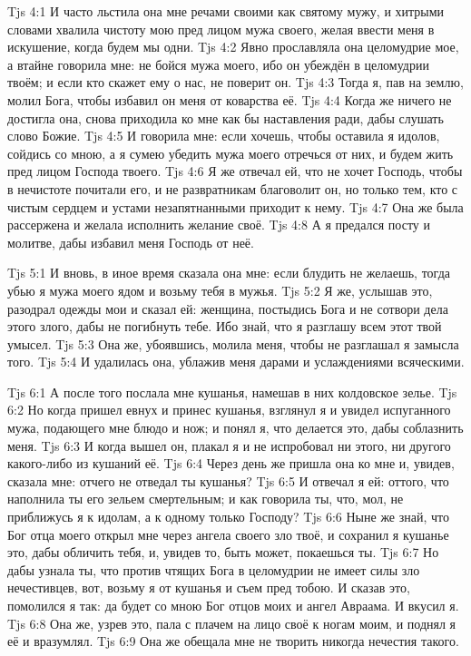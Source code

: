 \vs Tjs 4:1
И часто льстила она мне речами своими как святому мужу,
и хитрыми словами хвалила чистоту мою пред лицом мужа своего,
желая ввести меня в искушение,
когда будем мы одни.
\vs Tjs 4:2
Явно прославляла она целомудрие мое,
а втайне говорила мне: не бойся мужа моего, ибо он убеждён
в целомудрии твоём;
и если кто скажет ему о нас, не поверит он.
\vs Tjs 4:3
Тогда я, пав на землю, молил Бога,
чтобы избавил он меня от коварства её.
\vs Tjs 4:4
Когда же ничего не достигла она,
снова приходила ко мне как бы наставления ради,
дабы слушать слово Божие.
\vs Tjs 4:5
И говорила мне:
если хочешь, чтобы оставила я идолов,
сойдись со мною, а я сумею убедить мужа моего отречься от них,
и будем жить пред лицом Господа твоего.
\vs Tjs 4:6
Я же отвечал ей, что не хочет Господь,
чтобы в нечистоте почитали его,
и не развратникам благоволит он,
но только тем, кто с чистым сердцем 
и устами незапятнанными приходит к нему.
\vs Tjs 4:7
Она же была рассержена и желала исполнить желание своё.
\vs Tjs 4:8
А я предался посту и молитве, дабы избавил меня Господь от неё.

\vs Tjs 5:1
И вновь, в иное время сказала она мне:
если блудить не желаешь,
тогда убью я мужа моего ядом и возьму тебя в мужья.
\vs Tjs 5:2
Я же, услышав это, разодрал одежды мои и сказал ей:
женщина, постыдись Бога и не сотвори дела этого злого,
дабы не погибнуть тебе.
Ибо знай, что я разглашу всем этот твой умысел.
\vs Tjs 5:3
Она же, убоявшись, молила меня,
чтобы не разглашал я замысла того.
\vs Tjs 5:4
И удалилась она, ублажив меня дарами и услаждениями всяческими.

\vs Tjs 6:1
А после того послала мне кушанья, намешав в них колдовское зелье.
\vs Tjs 6:2
Но когда пришел евнух и принес кушанья, взглянул я и увидел
испуганного мужа, подающего мне блюдо и нож;
и понял я, что делается это, дабы соблазнить меня.
\vs Tjs 6:3
И когда вышел он, плакал я и не испробовал ни этого,
ни другого какого-либо из кушаний её.
\vs Tjs 6:4
Через день же пришла она ко мне и, увидев, сказала мне:
отчего не отведал ты кушанья?
\vs Tjs 6:5
И отвечал я ей:
оттого, что наполнила ты его зельем смертельным;
и как говорила ты, что, мол, не приближусь я к идолам,
а к одному только Господу?
\vs Tjs 6:6
Ныне же знай, что Бог отца моего открыл мне
через ангела своего зло твоё, и сохранил я кушанье это,
дабы обличить тебя, и, увидев то, быть может, покаешься ты.
\vs Tjs 6:7
Но дабы узнала ты,
что против чтящих Бога в целомудрии не имеет
силы зло нечестивцев,
вот, возьму я от кушанья и съем пред тобою.
И сказав это, помолился я так:
да будет со мною Бог отцов моих и ангел Авраама.
И вкусил я.
\vs Tjs 6:8
Она же, узрев это, пала с плачем на лицо своё к ногам моим,
и поднял я её и вразумлял.
\vs Tjs 6:9
Она же обещала мне не творить никогда нечестия такого.


